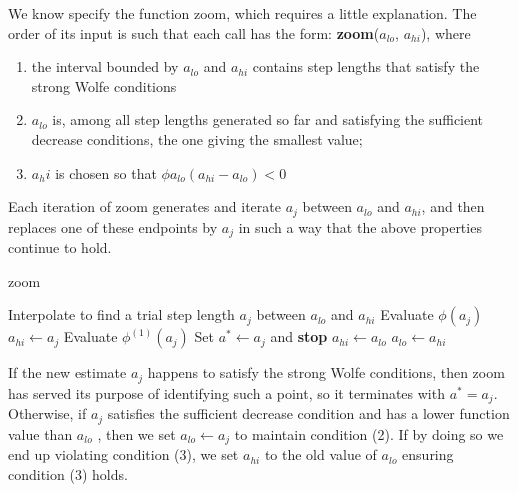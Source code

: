 \documentclass[11pt]{report}
\begin{document}
    We know specify the function zoom, which requires a little explanation.
    The order of its input is such that each call has the form: \textbf{zoom}($a_{lo}$, $a_{hi}$), where
    \begin{enumerate}
        \item the interval bounded by $a_{lo}$ and $a_{hi}$ contains step lengths that satisfy the strong Wolfe conditions
        \item $a_{lo}$ is, among all step lengths generated so far and satisfying the sufficient decrease conditions, the one giving the smallest value;
        \item $a_hi$ is chosen so that $\phi{a_{lo}}(a_{hi} - a_{lo}) < 0$
    \end{enumerate}
    Each iteration of zoom generates and iterate $a_j$ between $a_{lo}$ and $a_{hi}$, and then replaces one of these
    endpoints by $a_j$ in such a way that the above properties continue to hold.

    \begin{algorithm}
        \caption{zoom}
        \label{alg:zoom}
        \begin{algorithmic}
            \Repeat
                \State Interpolate to find a trial step length $a_j$ between $a_{lo}$ and $a_{hi}$
                \State Evaluate $\phi(a_j)$
                \If {$\phi(a_j) > \phi(0) + c_1 a_j \phi^{(1)}(0)$ or $\phi(a_j) \geq \phi(a_{lo}$]}
                    \State $a_{hi} \gets a_j$
                \Else
                    \State Evaluate $\phi^{(1)}(a_j)$
                        \State Set $a^* \gets a_j$ and \textbf{stop}
                    \EndIf
                        \State $a_{hi} \gets a_{lo}$
                    \EndIf
                    \State $a_{lo} \gets a_{hi}$
                \EndIf
            \Until
        \end{algorithmic}
    \end{algorithm}

    If the new estimate $a_j$ happens to satisfy the strong Wolfe conditions, then zoom has served
    its purpose of identifying such a point, so it terminates with $a^* = a_j$.
    Otherwise, if $a_j$ satisfies the sufficient decrease condition and has a lower function value than $a_{lo}$ ,
    then we set $a_{lo} \gets a_j$ to maintain condition (2).
    If by doing so we end up violating condition (3), we set $a_{hi}$ to the old value of $a_{lo}$ ensuring condition
    (3) holds.
\end{document}
